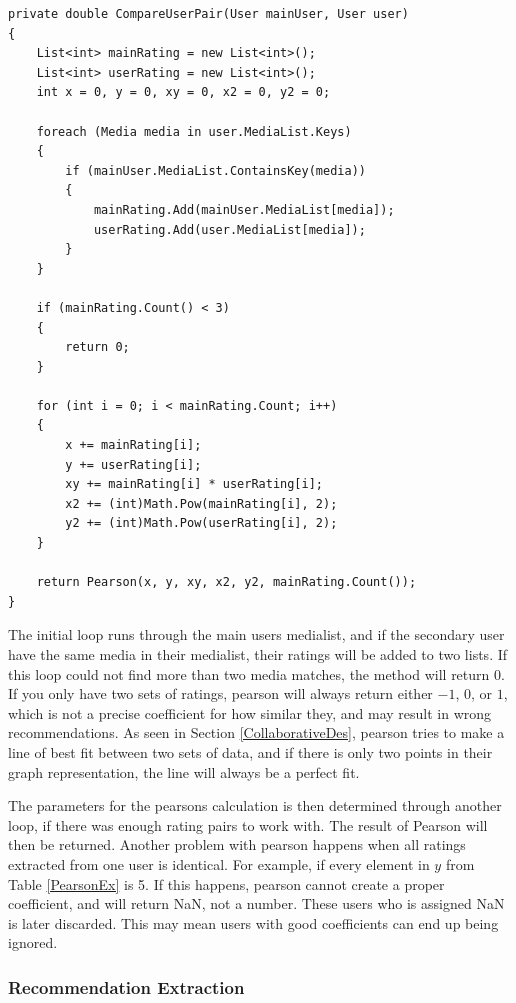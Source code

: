 \begin{lstlisting}[caption={The CompareUserPair method},label={CompareUserPairTwo}]
private double CompareUserPair(User mainUser, User user)
{
	List<int> mainRating = new List<int>();
	List<int> userRating = new List<int>();
	int x = 0, y = 0, xy = 0, x2 = 0, y2 = 0;

	foreach (Media media in user.MediaList.Keys)
	{
		if (mainUser.MediaList.ContainsKey(media))
		{
			mainRating.Add(mainUser.MediaList[media]);
			userRating.Add(user.MediaList[media]);
		}
	}

	if (mainRating.Count() < 3)
	{
		return 0;
	}

	for (int i = 0; i < mainRating.Count; i++)
	{
		x += mainRating[i];
		y += userRating[i];
		xy += mainRating[i] * userRating[i];
		x2 += (int)Math.Pow(mainRating[i], 2);
		y2 += (int)Math.Pow(userRating[i], 2);
	}

	return Pearson(x, y, xy, x2, y2, mainRating.Count());
}
\end{lstlisting}

The initial loop runs through the main users medialist, and if the secondary user have the same media in their medialist, their ratings will be added to two lists. If this loop could not find more than two media matches, the method will return 0. If you only have two sets of ratings, pearson will always return either $-1$, $0$, or $1$, which is not a precise coefficient for how similar they, and may result in wrong recommendations. As seen in Section \ref{CollaborativeDes}, pearson tries to make a line of best fit between two sets of data, and if there is only two points in their graph representation, the line will always be a perfect fit. 


The parameters for the pearsons calculation is then determined through another loop, if there was enough rating pairs to work with. The result of Pearson will then be returned. Another problem with pearson happens when all ratings extracted from one user is identical. For example, if every element in $y$ from Table \ref{PearsonEx} is 5. If this happens, pearson cannot create a proper coefficient, and will return NaN, not a number. These users who is assigned NaN is later discarded. This may mean users with good coefficients can end up being ignored.

\subsubsection{Recommendation Extraction}

